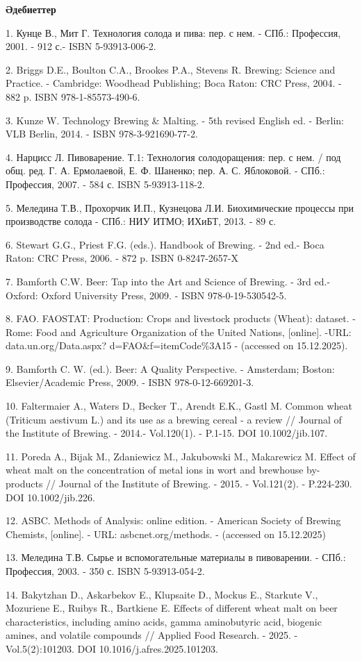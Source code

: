 \begin{center}
{\bfseries Әдебиеттер}
\end{center}

\begin{refs}
1. Кунце В., Мит Г. Технология солода и пива: пер. с нем. - СПб.:
Профессия, 2001. - 912 с.- ISBN 5-93913-006-2.

2. Briggs D.E., Boulton C.A., Brookes P.A., Stevens R. Brewing: Science
and Practice. - Cambridge: Woodhead Publishing; Boca Raton: CRC Press,
2004. - 882 p. ISBN 978-1-85573-490-6.

3. Kunze W. Technology Brewing \& Malting. - 5th revised English ed. -
Berlin: VLB Berlin, 2014. - ISBN 978-3-921690-77-2.

4. Нарцисс Л. Пивоварение. Т.1: Технология солодоращения: пер. с нем. /
под общ. ред. Г. А. Ермолаевой, Е. Ф. Шаненко; пер. А. С. Яблоковой. -
СПб.: Профессия, 2007. - 584 с. ISBN 5-93913-118-2.

5. Меледина Т.В., Прохорчик И.П., Кузнецова Л.И. Биохимические процессы
при производстве солода - СПб.: НИУ ИТМО; ИХиБТ, 2013. - 89 с.

6. Stewart G.G., Priest F.G. (eds.). Handbook of Brewing. - 2nd ed.-
Boca Raton: CRC Press, 2006. - 872 p. ISBN 0-8247-2657-X

7. Bamforth C.W. Beer: Tap into the Art and Science of Brewing. - 3rd
ed.-Oxford: Oxford University Press, 2009. - ISBN 978-0-19-530542-5.

8. FAO. FAOSTAT: Production: Crops and livestock products (Wheat):
dataset. - Rome: Food and Agriculture Organization of the United
Nations, {[}online{]}. -URL: data.un.org/Data.aspx?
d=FAO\&f=itemCode\%3A15 - (accessed on 15.12.2025).

9. Bamforth C. W. (ed.). Beer: A Quality Perspective. - Amsterdam;
Boston: Elsevier/Academic Press, 2009. - ISBN 978-0-12-669201-3.

10. Faltermaier A., Waters D., Becker T., Arendt E.K., Gastl M. Common
wheat (Triticum aestivum L.) and its use as a brewing cereal - a review
// Journal of the Institute of Brewing. - 2014.- Vol.120(1). - P.1-15.
DOI 10.1002/jib.107.

11. Poreda A., Bijak M., Zdaniewicz M., Jakubowski M., Makarewicz M.
Effect of wheat malt on the concentration of metal ions in wort and
brewhouse by-products // Journal of the Institute of Brewing. - 2015. -
Vol.121(2). - P.224-230. DOI 10.1002/jib.226.

12. ASBC. Methods of Analysis: online edition. - American Society of
Brewing Chemists, {[}online{]}. - URL: asbcnet.org/methods. - (accessed
on 15.12.2025)

13. Меледина Т.В. Сырье и вспомогательные материалы в пивоварении. -
СПб.: Профессия, 2003. - 350 с. ISBN 5-93913-054-2.

14. Bakytzhan D., Askarbekov E., Klupsaite D., Mockus E., Starkute V.,
Mozuriene E., Ruibys R., Bartkiene E. Effects of different wheat malt on
beer characteristics, including amino acids, gamma aminobutyric acid,
biogenic amines, and volatile compounds // Applied Food Research. -
2025. -Vol.5(2):101203. DOI 10.1016/j.afres.2025.101203.
\end{refs}

